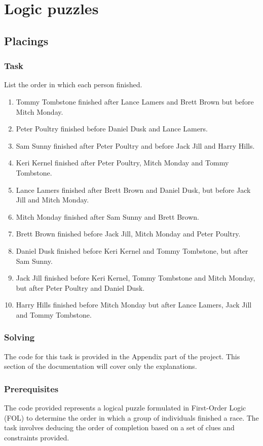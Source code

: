 \documentclass[a4paper,12pt]{report}
\begin{document}
\section{Logic puzzles}
\subsection{Placings}
\subsubsection{\Large Task}
List the order in which each person finished.
\begin{enumerate}
    \item Tommy Tombstone finished after Lance Lamers and Brett Brown but before Mitch Monday.
    \item Peter Poultry finished before Daniel Dusk and Lance Lamers.
    \item Sam Sunny finished after Peter Poultry and before Jack Jill and Harry Hills.
    \item Keri Kernel finished after Peter Poultry, Mitch Monday and Tommy Tombstone.
    \item Lance Lamers finished after Brett Brown and Daniel Dusk, but before Jack Jill and Mitch Monday.
    \item Mitch Monday finished after Sam Sunny and Brett Brown.
    \item Brett Brown finished before Jack Jill, Mitch Monday and Peter Poultry.
    \item Daniel Dusk finished before Keri Kernel and Tommy Tombstone, but after Sam Sunny.
    \item Jack Jill finished before Keri Kernel, Tommy Tombstone and Mitch Monday, but after Peter Poultry and Daniel Dusk.
    \item Harry Hills finished before Mitch Monday but after Lance Lamers, Jack Jill and Tommy Tombstone.
\end{enumerate}

\subsubsection{\Large Solving}
The code for this task is provided in the Appendix part of the project. This section of the documentation will cover only the explanations. 
\subsubsection{Prerequisites}
The code provided represents a logical puzzle formulated in First-Order Logic (FOL) to determine the order in which a group of individuals finished a race. The task involves deducing the order of completion based on a set of clues and constraints provided.
\end{document}

